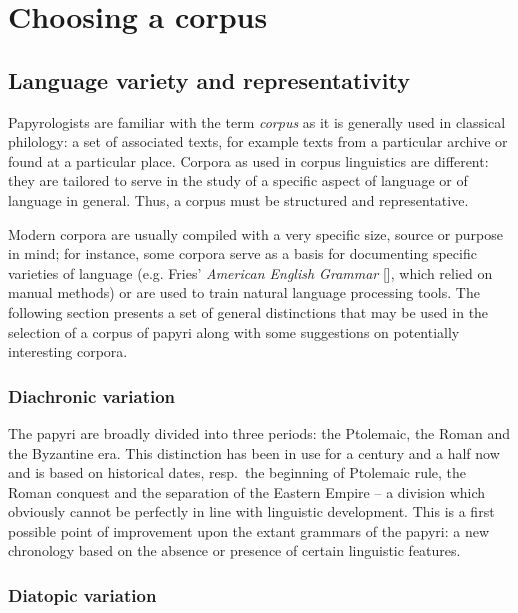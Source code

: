 \chapter{Choosing a corpus}
\label{chp:corpuscreation}
\minitoc\mtcskip
\section{Language variety and representativity}
\label{sect:variety}

Papyrologists are familiar with the term \emph{corpus} as it is generally used
in classical philology: a set of associated texts, for example texts from a
particular archive or found at a particular place. Corpora as used in corpus
linguistics are different: they are tailored to serve in the study of a
specific aspect of language or of language in general. Thus, a corpus must be
structured and representative.

Modern corpora are usually compiled with a very specific size, source or
purpose in mind; for instance, some corpora serve as a basis for documenting
specific varieties of language (e.g. Fries' \emph{American English Grammar}
[\citeyear{fries1940}], which relied on manual methods) or are used to train
natural language processing tools. The following section presents a set of
general distinctions that may be used in the selection of a corpus of papyri
along with some suggestions on potentially interesting corpora.

\subsection{Diachronic variation}
\label{subsect:diachronic}

The papyri are broadly divided into three periods: the Ptolemaic, the Roman and
the Byzantine era. This distinction has been in use for a century and a half
now and is based on historical dates, resp.\ the beginning of Ptolemaic rule,
the Roman conquest and the separation of the Eastern Empire – a division which
obviously cannot be perfectly in line with linguistic development. This is a
first possible point of improvement upon the extant grammars of the papyri: a
new chronology based on the absence or presence of certain linguistic features.

\subsection{Diatopic variation}
\label{subsect:diatopic}


